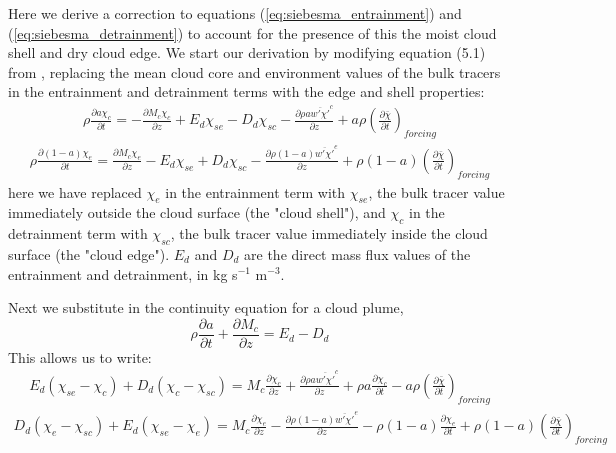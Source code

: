 \documentclass[draft,grl]{agutex}
\begin{document}
\begin{article}
Here we derive a correction to equations (\ref{eq:siebesma_entrainment}) and 
(\ref{eq:siebesma_detrainment}) to account for the presence of this the moist 
cloud shell and dry cloud edge.  We start our derivation by modifying equation 
(5.1) from \cite{Siebesma1995}, replacing the mean cloud core and environment 
values of the bulk tracers in the entrainment and detrainment terms with the 
edge and shell properties:
\begin{eqnarray}
  \label{eq:entrainment_derivation_1}
    \rho \frac{\partial a \chi_c}{\partial t} 
    = - \frac{\partial M_c \chi_c}{\partial z} 
    + E_d \chi_{se} - D_d \chi_{sc} 
    - \frac{\partial \rho a \overline{w' \chi'}^c}{\partial z} 
    + a \rho \left(\frac{\partial \bar{\chi}}{\partial t}\right)_{forcing}
\end{eqnarray}
\begin{eqnarray}
  \label{eq:detrainment_derivation_1}
    \rho \frac{\partial (1 - a) \chi_e}{\partial t}
    = \frac{\partial M_c \chi_e}{\partial z} 
    - E_d \chi_{se} + D_d \chi_{sc} 
    - \frac{\partial \rho (1 - a) \overline{w' \chi'}^e}{\partial z} 
    + \rho (1 - a) \left(\frac{\partial \bar{\chi}}{\partial t}\right)_{forcing}
\end{eqnarray}
here we have replaced $\chi_e$ in the entrainment term with $\chi_{se}$, the 
bulk tracer value immediately outside the cloud surface (the "cloud shell"), and 
$\chi_c$ in the detrainment term with $\chi_{sc}$, the bulk tracer value 
immediately inside the cloud surface (the "cloud edge").  $E_d$ and $D_d$ are 
the direct mass flux values of the entrainment and detrainment, in kg s$^{-1}$ 
m$^{-3}$.

Next we substitute in the continuity equation for a cloud plume,
\begin{equation}
   \label{eq:continuity}
   \rho \frac{\partial a}{\partial t} 
   + \frac{\partial M_c}{\partial z} = E_d - D_d
\end{equation}
This allows us to write:
\begin{eqnarray}
  \label{eq:entrainment_derivation_2}
    E_d (\chi_{se} - \chi_c) + D_d (\chi_c - \chi_{sc}) 
    = M_c \frac{\partial \chi_c}{\partial z}
    + \frac{\partial \rho a \overline{w' \chi'}^c}{\partial z} 
    + \rho a \frac{\partial \chi_c}{\partial t}
    - a \rho \left(\frac{\partial \bar{\chi}}{\partial t}\right)_{forcing}
\end{eqnarray}
\begin{eqnarray}
  \label{eq:detrainment_derivation_2}
    D_d (\chi_e - \chi_{sc}) + E_d (\chi_{se} - \chi_e)
    = M_c \frac{\partial \chi_e}{\partial z}
    - \frac{\partial \rho (1 - a) \overline{w' \chi'}^e}{\partial z} 
    - \rho (1 - a) \frac{\partial \chi_e}{\partial t}
    + \rho (1 - a) \left(\frac{\partial \bar{\chi}}{\partial t}\right)_{forcing}
\end{eqnarray}


\end{article}
\end{document}
